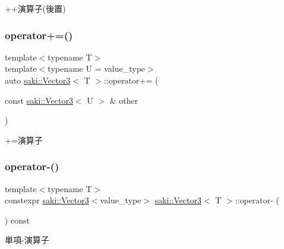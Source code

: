 ++演算子(後置) 

\mbox{\label{classsaki_1_1_vector3_a4ea98424be42bb8a20d8d240d25c948d}} 
\subsubsection{\texorpdfstring{operator+=()}{operator+=()}}
{\footnotesize\ttfamily template$<$typename T$>$ \\
template$<$typename U  = value\+\_\+type$>$ \\
auto \mbox{\hyperlink{classsaki_1_1_vector3}{saki\+::\+Vector3}}$<$ T $>$\+::operator+= (\begin{DoxyParamCaption}\item[{const \mbox{\hyperlink{classsaki_1_1_vector3}{saki\+::\+Vector3}}$<$ U $>$ \&}]{other }\end{DoxyParamCaption})\hspace{0.3cm}{\ttfamily [inline]}}



+=演算子 

\mbox{\label{classsaki_1_1_vector3_acba33249e560bb2a8d51c9af38c7f89b}} 
\subsubsection{\texorpdfstring{operator-\/()}{operator-()}}
{\footnotesize\ttfamily template$<$typename T$>$ \\
constexpr \mbox{\hyperlink{classsaki_1_1_vector3}{saki\+::\+Vector3}}$<$value\+\_\+type$>$ \mbox{\hyperlink{classsaki_1_1_vector3}{saki\+::\+Vector3}}$<$ T $>$\+::operator-\/ (\begin{DoxyParamCaption}{ }\end{DoxyParamCaption}) const\hspace{0.3cm}{\ttfamily [inline]}}



単項-\/演算子 

\mbox{\label{classsaki_1_1_vector3_abdb5c984e59deedd88b76d3530098a44}} 

